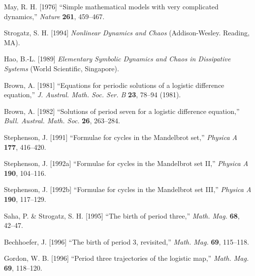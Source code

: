 \documentclass{ws-ijbc}
\begin{document}












\begin{thebibliography}{50}


  May, R. H. [1976]
  ``Simple mathematical models with very complicated dynamics,''
  {\it Nature}
  \textbf{261},
  459--467.

  Strogatz, S. H. [1994]
  {\it Nonlinear Dynamics and Chaos}
  (Addison-Wesley. Reading, MA).

  Hao, B.-L. [1989]
  {\it Elementary Symbolic Dynamics and Chaos in  Dissipative Systems}
  (World Scientific, Singapore).

  Brown, A. [1981]
  ``Equations for periodic solutions of a logistic difference equation,''
  {\it J. Austral. Math. Soc. Ser. B}
  \textbf{23},
  78--94
  (1981).

  Brown, A. [1982]
  ``Solutions of period seven for a logistic difference equation,''
  {\it Bull. Austral. Math. Soc.}
  \textbf{26},
  263--284.

  Stephenson, J. [1991]
  ``Formulae for cycles in the Mandelbrot set,''
  {\it Physica A}
  \textbf{177},
  416--420.

  Stephenson, J. [1992a]
  ``Formulae for cycles in the Mandelbrot set II,''
  {\it Physica A}
  \textbf{190},
  104--116.

  Stephenson, J. [1992b]
  ``Formulae for cycles in the Mandelbrot set III,''
  {\it Physica A}
  \textbf{190},
  117--129.

  Saha, P. \& Strogatz, S. H. [1995]
  ``The birth of period three,''
  {\it Math. Mag.}
  \textbf{68},
  42--47.

  Bechhoefer, J. [1996]
  ``The birth of period 3, revisited,''
  {\it Math. Mag.}
  \textbf{69},
  115--118.

  Gordon, W. B. [1996]
  ``Period three trajectories of the logistic map,''
  {\it Math. Mag.}
  \textbf{69},
  118--120.


\end{thebibliography}
\end{document}
